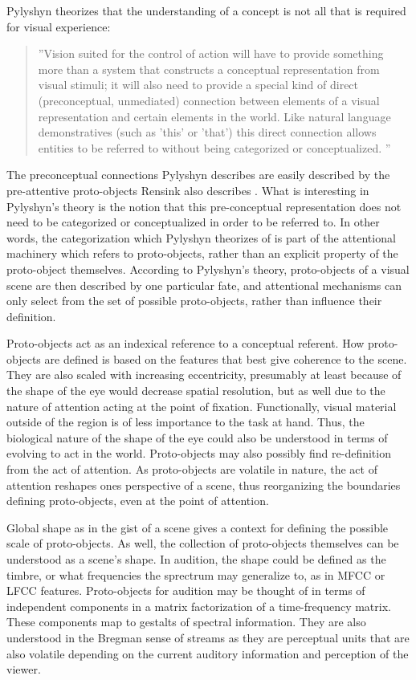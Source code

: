\documentclass[a4paper,11pt,final]{ThesisStyle}
\begin{document}
Pylyshyn theorizes that the understanding of a concept is not all that is required for visual experience: 
\begin{quotation}
''Vision suited for the control of action will have to provide something more than a system that constructs a conceptual representation from visual stimuli; it will also need to provide a special kind of direct (preconceptual, unmediated) connection between elements of a visual representation and certain elements in the world. Like natural language demonstratives (such as 'this' or 'that') this direct connection allows entities to be referred to without being categorized or conceptualized. \cite{Pylyshyn2001}''
\end{quotation}  
The preconceptual connections Pylyshyn describes are easily described by the pre-attentive proto-objects Rensink also describes \cite{Rensink2000,Rensink2001}.  What is interesting in Pylyshyn's theory is the notion that this pre-conceptual representation does not need to be categorized or conceptualized in order to be referred to.  In other words, the categorization which Pylyshyn theorizes of is part of the attentional machinery which refers to proto-objects, rather than an explicit property of the proto-object themselves.  According to Pylyshyn's theory, proto-objects of a visual scene are then described by one particular fate, and attentional mechanisms can only select from the set of possible proto-objects, rather than influence their definition. 

Proto-objects act as an indexical reference to a conceptual referent.  How proto-objects are defined is based on the features that best give coherence to the scene.  They are also scaled with increasing eccentricity, presumably at least because of the shape of the eye would decrease spatial resolution, but as well due to the nature of attention acting at the point of fixation.  Functionally, visual material outside of the region is of less importance to the task at hand.  Thus, the biological nature of the shape of the eye could also be understood in terms of evolving to act in the world.  Proto-objects may also possibly find re-definition from the act of attention.  As proto-objects are volatile in nature, the act of attention reshapes ones perspective of a scene, thus reorganizing the boundaries defining proto-objects, even at the point of attention.

Global shape as in the gist of a scene gives a context for defining the possible scale of proto-objects.  As well, the collection of proto-objects themselves can be understood as a scene's shape.  In audition, the shape could be defined as the timbre, or what frequencies the sprectrum may generalize to, as in MFCC or LFCC features.  Proto-objects for audition may be thought of in terms of independent components in a matrix factorization of a time-frequency matrix.  These components map to gestalts of spectral information.  They are also understood in the Bregman sense of streams as they are perceptual units that are also volatile depending on the current auditory information and perception of the viewer.
\end{document}
